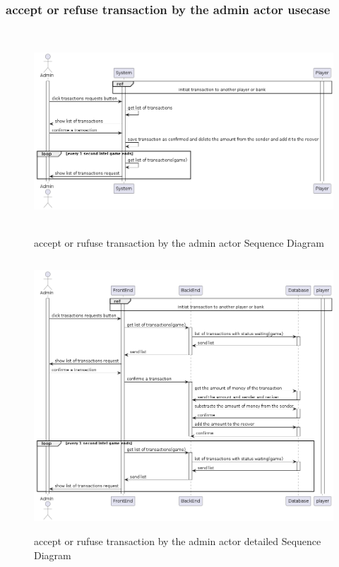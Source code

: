 \documentclass{article}
\begin{document}
\subsubsection{accept or refuse transaction by the admin actor usecase}
 \begin{figure}[H]
	 \centering
	 \includegraphics[height=3in]{../thesis_tex/assets/diagrams/accept_refuse_transaction_SD.png}
	 \caption{accept or rufuse transaction by the admin actor Sequence Diagram}
\end{figure}

 \begin{figure}[H]
	 \centering
	 \includegraphics[height=4in,width=6in]{../thesis_tex/assets/diagrams/accept_refuse_transaction_detailedSD.png}
	 \caption{accept or rufuse transaction by the admin actor detailed Sequence Diagram}
\end{figure}
\end{document}
